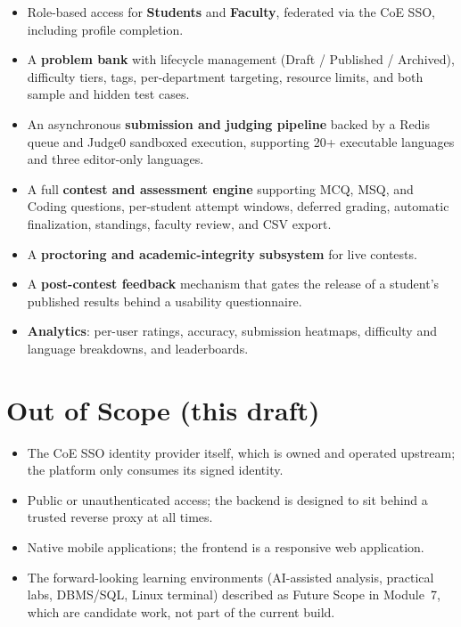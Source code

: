 \documentclass[12pt,a4paper,oneside]{report}
\begin{document}
\begin{itemize}[leftmargin=1.5em]
  \item Role-based access for \textbf{Students} and \textbf{Faculty}, federated
        via the CoE SSO, including profile completion.
  \item A \textbf{problem bank} with lifecycle management (Draft / Published /
        Archived), difficulty tiers, tags, per-department targeting, resource
        limits, and both sample and hidden test cases.
  \item An asynchronous \textbf{submission and judging pipeline} backed by a
        Redis queue and Judge0 sandboxed execution, supporting 20+ executable
        languages and three editor-only languages.
  \item A full \textbf{contest and assessment engine} supporting MCQ, MSQ, and
        Coding questions, per-student attempt windows, deferred grading,
        automatic finalization, standings, faculty review, and CSV export.
  \item A \textbf{proctoring and academic-integrity subsystem} for live contests.
  \item A \textbf{post-contest feedback} mechanism that gates the release of a
        student's published results behind a usability questionnaire.
  \item \textbf{Analytics}: per-user ratings, accuracy, submission heatmaps,
        difficulty and language breakdowns, and leaderboards.
\end{itemize}

\section{Out of Scope (this draft)}
\begin{itemize}[leftmargin=1.5em]
  \item The CoE SSO identity provider itself, which is owned and operated
        upstream; the platform only consumes its signed identity.
  \item Public or unauthenticated access; the backend is designed to sit behind a
        trusted reverse proxy at all times.
  \item Native mobile applications; the frontend is a responsive web application.
  \item The forward-looking learning environments (AI-assisted analysis,
        practical labs, DBMS/SQL, Linux terminal) described as Future Scope in
        Module~7, which are candidate work, not part of the current build.
\end{itemize}
\end{document}
